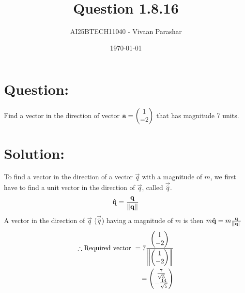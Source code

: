 \documentclass[a4paper, 12pt]{article}
\title{Question 1.8.16}
\author{AI25BTECH11040 - Vivaan Parashar}
\date{\today}
\begin{document}
\maketitle

\section{Question: }
Find a vector in the direction of vector $\mathbf{a} = \begin{pmatrix}1 \\ -2\end{pmatrix}$ that has magnitude 7 units.

\section{Solution: }
To find a vector in the direction of a vector $\vec{q}$ with a magnitude of $m$, we first have to find a unit vector in the direction of $\vec{q}$, called $\vec{\hat{q}}$.
\begin{align}
    \mathbf{\hat{q}} = \frac{\mathbf{q}}{\left\lVert\mathbf{q}\right\rVert}
\end{align}
A vector in the direction of $\vec{q}$ ($\vec{\hat{q}}$) having a magnitude of $m$ is then $m \mathbf{\hat{q}} = m\frac{\mathbf{q}}{\left\lVert\mathbf{q}\right\rVert}$
\begin{align}
    \therefore \text{Required vector } = 7\frac{\begin{pmatrix}1 \\ -2\end{pmatrix}}{\left\lVert\begin{pmatrix}1 \\ -2\end{pmatrix}\right\rVert}\\
    = \begin{pmatrix}\frac{7}{\sqrt{5}} \\ - \frac{14}{\sqrt{5}}\end{pmatrix}
\end{align}
\end{document}

